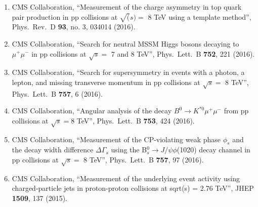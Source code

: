 \begin{itemize}
\begin{enumerate}
\item CMS Collaboration, ``Measurement of the charge asymmetry in top quark pair production in pp collisions at $\sqrt(s) =$ 8 TeV using a template method'', Phys.\ Rev.\ D {\bf 93}, no. 3, 034014 (2016).

\item CMS Collaboration, ``Search for neutral MSSM Higgs bosons decaying to $\mu^{+} \mu^{-}$ in pp collisions at $ \sqrt{s} =$ 7 and 8 TeV'', Phys.\ Lett.\ B {\bf 752}, 221 (2016).

\item CMS Collaboration, ``Search for supersymmetry in events with a photon, a lepton, and missing transverse momentum in pp collisions at $\sqrt s=$ 8 TeV'', Phys.\ Lett.\ B {\bf 757}, 6 (2016).

\item CMS Collaboration, ``Angular analysis of the decay $B^0 \to K^{*0} \mu^+ \mu^-$ from pp collisions at $\sqrt  s = 8$ TeV'', Phys.\ Lett.\ B {\bf 753}, 424 (2016).

\item CMS Collaboration, ``Measurement of the CP-violating weak phase $\phi_s$ and the decay width difference $\Delta \Gamma_s$ using the B$_s^0 \to J/\psi\phi$(1020) decay channel in pp collisions at $\sqrt{s}=$ 8 TeV'', Phys.\ Lett.\ B {\bf 757}, 97 (2016).

\item CMS Collaboration, ``Measurement of the underlying event activity using charged-particle jets in proton-proton collisions at sqrt(s) = 2.76 TeV'', JHEP {\bf 1509}, 137 (2015).


\end{enumerate}
\end{itemize}
